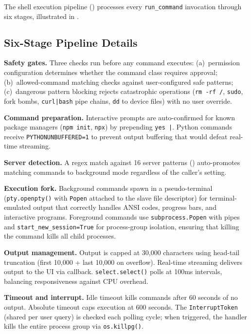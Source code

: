 The shell execution pipeline () processes every \texttt{run\_command} invocation through six stages, illustrated in .

\subsection{Six-Stage Pipeline Details}
\label{app:bash_stages}

\begin{packedenumerate}
\item \textbf{Safety gates.} Three checks run before any command executes: (a)~permission configuration determines whether the command class requires approval; (b)~allowed-command matching checks against user-configured safe patterns; (c)~dangerous pattern blocking rejects catastrophic operations (\texttt{rm -rf /}, \texttt{sudo}, fork bombs, \texttt{curl|bash} pipe chains, \texttt{dd} to device files) with no user override.

\item \textbf{Command preparation.} Interactive prompts are auto-confirmed for known package managers (\texttt{npm init}, \texttt{npx}) by prepending \texttt{yes |}. Python commands receive \texttt{PYTHONUNBUFFERED=1} to prevent output buffering that would defeat real-time streaming.

\item \textbf{Server detection.} A regex match against 16 server patterns () auto-promotes matching commands to background mode regardless of the caller's setting.

\item \textbf{Execution fork.} Background commands spawn in a pseudo-terminal (\texttt{pty.openpty()} with \texttt{Popen} attached to the slave file descriptor) for terminal-emulated output that correctly handles ANSI codes, progress bars, and interactive programs. Foreground commands use \texttt{subprocess.Popen} with pipes and \texttt{start\_new\_session=True} for process-group isolation, ensuring that killing the command kills all child processes.

\item \textbf{Output management.} Output is capped at 30,000 characters using head-tail truncation (first 10,000 + last 10,000 on overflow). Real-time streaming delivers output to the UI via callback. \texttt{select.select()} polls at 100ms intervals, balancing responsiveness against CPU overhead.

\item \textbf{Timeout and interrupt.} Idle timeout kills commands after 60 seconds of no output. Absolute timeout caps execution at 600 seconds. The \texttt{InterruptToken} (shared per user query) is checked each polling cycle; when triggered, the handler kills the entire process group via \texttt{os.killpg()}.
\end{packedenumerate}


